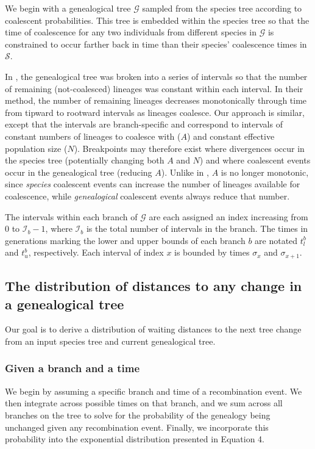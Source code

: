 \documentclass[11pt]{article}
\begin{document}
We begin with a genealogical tree $\mathcal{G}$ sampled from the species tree according to coalescent probabilities. This tree is embedded within the species tree so that the time of coalescence for any two individuals from different species in $\mathcal{G}$ is constrained to occur farther back in time than their species' coalescence times in $\mathcal{S}$.

In \citet{deng_distribution_2021}, the genealogical tree was broken into a series of intervals so that the number of remaining (not-coalesced) lineages was constant within each interval. In their method, the number of remaining lineages decreases monotonically through time from tipward to rootward intervals as lineages coalesce. Our approach is similar, except that the intervals are branch-specific and correspond to intervals of constant numbers of lineages to coalesce with ($A$) and constant effective population size ($N$). Breakpoints may therefore exist where divergences occur in the species tree (potentially changing both $A$ and $N$) and where coalescent events occur in the genealogical tree (reducing $A$). Unlike in \citet{deng_distribution_2021}, $A$ is no longer monotonic, since \emph{species} coalescent events can increase the number of lineages available for coalescence, while \emph{genealogical} coalescent events always reduce that number. 

The intervals within each branch of $\mathcal{G}$ are each assigned an index increasing from $0$ to $\mathcal{I}_b-1$, where $\mathcal{I}_b$ is the total number of intervals in the branch. The times in generations marking the lower and upper bounds of each branch $b$ are notated $t_l^b$ and $t_u^b$, respectively. Each interval of index $x$ is bounded by times $\sigma_x$ and $\sigma_{x+1}$.

\subsection{The distribution of distances to any change in a genealogical tree}

Our goal is to derive a distribution of waiting distances to the next tree change from an input species tree and current genealogical tree.

\subsubsection{Given a branch and a time}

We begin by assuming a specific branch and time of a recombination event. We then integrate across possible times on that branch, and we sum across all branches on the tree to solve for the probability of the genealogy being unchanged given any recombination event. Finally, we incorporate this probability into the exponential distribution presented in Equation 4.
\end{document}
